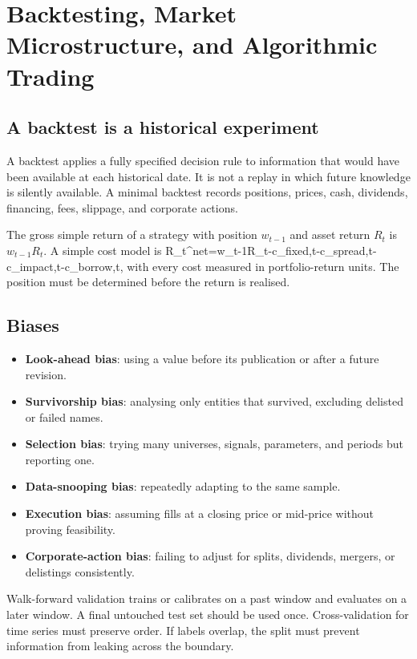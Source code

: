 \chapter{Backtesting, Market Microstructure, and Algorithmic Trading}

\section{A backtest is a historical experiment}
A backtest applies a fully specified decision rule to information that would have been available at each historical date. It is not a replay in which future knowledge is silently available. A minimal backtest records positions, prices, cash, dividends, financing, fees, slippage, and corporate actions.

The gross simple return of a strategy with position $w_{t-1}$ and asset return $R_t$ is $w_{t-1}R_t$. A simple cost model is
  R_t^{net}=w_{t-1}R_t-c_{fixed,t}-c_{spread,t}-c_{impact,t}-c_{borrow,t},
\closeformula
with every cost measured in portfolio-return units. The position must be determined before the return is realised.

\section{Biases}
\begin{itemize}
  \item \textbf{Look-ahead bias}: using a value before its publication or after a future revision.
  \item \textbf{Survivorship bias}: analysing only entities that survived, excluding delisted or failed names.
  \item \textbf{Selection bias}: trying many universes, signals, parameters, and periods but reporting one.
  \item \textbf{Data-snooping bias}: repeatedly adapting to the same sample.
  \item \textbf{Execution bias}: assuming fills at a closing price or mid-price without proving feasibility.
  \item \textbf{Corporate-action bias}: failing to adjust for splits, dividends, mergers, or delistings consistently.
\end{itemize}

Walk-forward validation trains or calibrates on a past window and evaluates on a later window. A final untouched test set should be used once. Cross-validation for time series must preserve order. If labels overlap, the split must prevent information from leaking across the boundary.

